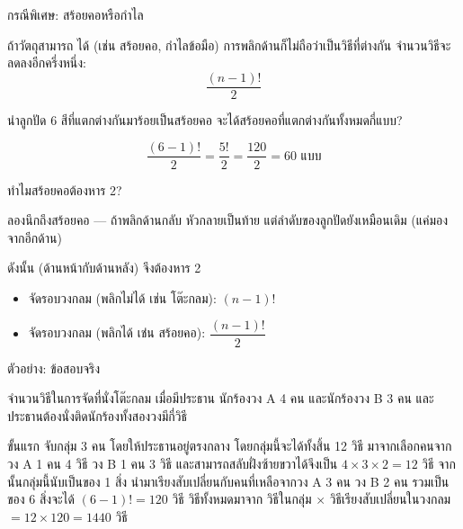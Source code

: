 \documentclass[11pt, aspectratio=169]{beamer}
\begin{document}
\begin{frame}{กรณีพิเศษ: สร้อยคอหรือกำไล}
  \begin{explanation}[ข้อสังเกต]
    ถ้าวัตถุสามารถ  ได้ (เช่น สร้อยคอ, กำไลข้อมือ)
    การพลิกด้านก็ไม่ถือว่าเป็นวิธีที่ต่างกัน
    จำนวนวิธีจะลดลงอีกครึ่งหนึ่ง:
    \[
      \frac{(n-1)!}{2}
    \]
  \end{explanation}

  \begin{exambox}
    นำลูกปัด 6 สีที่แตกต่างกันมาร้อยเป็นสร้อยคอ จะได้สร้อยคอที่แตกต่างกันทั้งหมดกี่แบบ?

    \medskip
    \[
      \frac{(6-1)!}{2} = \frac{5!}{2} = \frac{120}{2} = 60 \text{ แบบ}
    \]
  \end{exambox}
\end{frame}

\begin{frame}{ทำไมสร้อยคอต้องหาร 2?}
  \begin{intuition}
    ลองนึกถึงสร้อยคอ — ถ้าพลิกด้านกลับ หัวกลายเป็นท้าย
    แต่ลำดับของลูกปัดยังเหมือนเดิม (แค่มองจากอีกด้าน)

    \medskip
    ดังนั้น  (ด้านหน้ากับด้านหลัง) จึงต้องหาร 2
  \end{intuition}

  \begin{explanation}[สรุปสูตร]
    \begin{itemize}
      \item จัดรอบวงกลม (พลิกไม่ได้ เช่น โต๊ะกลม): \quad $(n-1)!$
      \item จัดรอบวงกลม (พลิกได้ เช่น สร้อยคอ): \quad $\dfrac{(n-1)!}{2}$
    \end{itemize}
  \end{explanation}
\end{frame}

\begin{frame}{ตัวอย่าง: ข้อสอบจริง}
  \begin{exambox}[โจทย์ปี 67 ข้อ 24]
    จำนวนวิธีในการจัดที่นั่งโต๊ะกลม เมื่อมีประธาน นักร้องวง A 4 คน และนักร้องวง B 3 คน และประธานต้องนั่งติดนักร้องทั้งสองวงมีกี่วิธี 
  \end{exambox}

  \begin{solbox}[วิธีทำ]
    ขั้นแรก จับกลุ่ม 3 คน โดยให้ประธานอยู่ตรงกลาง โดยกลุ่มนี้จะได้ทั้งสิ้น 12 วิธี มาจากเลือกคนจากวง A 1 คน 4 วิธี วง B 1 คน 3 วิธี และสามารถสลับฝั่งซ้ายขวาได้จึงเป็น $4 \times 3 \times 2 = 12$ วิธี \newline
    จากนั้นกลุ่มนี้นับเป็นของ 1 สิ่ง นำมาเรียงสับเปลี่ยนกับคนที่เหลือจากวง A 3 คน วง B 2 คน รวมเป็น ของ 6 สิ่งจะได้ $(6-1)!=120$ วิธี \newline
    วิธีทั้งหมดมาจาก วิธีในกลุ่ม $\times$ วิธีเรียงสับเปลี่ยนในวงกลม $=12 \times 120=1440$ วิธี
  \end{solbox}
\end{frame}
\end{document}
